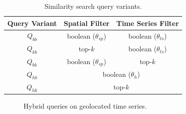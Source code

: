 \begin{table}[!ht]
 \centering
 \caption{Similarity search query variants.}
 \vspace{-10pt}
 \begin{small}
 \begin{tabular}{c c c}
  \toprule
  Query Variant & Spatial Filter & Time Series Filter \\
  \midrule
  $Q_{bb}$ & boolean ($\theta_{sp}$) & boolean ($\theta_{ts}$) \\
  $Q_{kb}$ & top-$k$ & boolean ($\theta_{ts}$) \\
  $Q_{bk}$ & boolean ($\theta_{sp}$) & top-$k$ \\
  $Q_{hb}$ & \multicolumn{2}{c}{boolean ($\theta_{h}$)} \\
  $Q_{hk}$ & \multicolumn{2}{c}{top-$k$} \\
  \bottomrule
 \end{tabular}
 \end{small}
 \label{tab:query_types}
\end{table}

\begin{figure}[!tb]
 \centering
 \qquad
\caption{Hybrid queries on geolocated time series.}
\label{fig:example_queries}
\end{figure}

